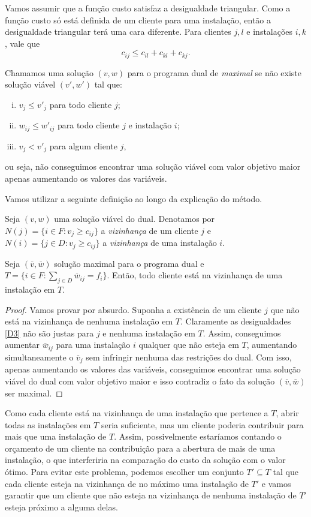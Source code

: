 Vamos assumir que a função custo satisfaz a desigualdade triangular. Como a função custo só está definida de um cliente para uma instalação, então a desigualdade triangular terá uma cara diferente. Para clientes $j,l$ e  instalações $i,k$, vale que
\[c_{ij} \leq c_{il} + c_{kl} + c_{kj}.\]

Chamamos uma solução $(v,w)$ para o programa dual de \emph{maximal} se não existe solução viável $(v',w')$ tal que:
\begin{enumerate}[(i)]
    \item $v_j \leq v'_j$ para todo cliente $j$;
    \item $w_{ij} \leq w'_{ij}$ para todo cliente $j$ e instalação $i$;
    \item $v_j < v'_j$ para algum cliente $j$,
\end{enumerate}
ou seja, não conseguimos encontrar uma solução viável com valor objetivo maior apenas aumentando os valores das variáveis.

Vamos utilizar a seguinte definição ao longo da explicação do método.
\begin{definition}
    Seja $(v,w)$ uma solução viável do dual. Denotamos por $N(j) = \{i \in F:v_j \geq c_{ij}\}$ a \emph{vizinhança} de um cliente $j$ e $N(i) = \{j \in D:v_j \geq c_{ij}\}$ a \emph{vizinhança} de uma instalação $i$.
\end{definition}

\begin{theorem}
    Seja $(\overline v, \overline w)$ solução maximal para o programa dual e $T = \{i \in F: \sum_{j \in D} \overline{w}_{ij} = f_i\}$. Então, todo cliente está na vizinhança de uma instalação em $T$.      
\end{theorem}
\begin{proof}
    Vamos provar por absurdo. Suponha a existência de um cliente $j$ que não está na vizinhança de nenhuma instalação em $T$. Claramente as desigualdades \eqref{D3} não são justas para $j$ e nenhuma instalação em $T$. Assim, conseguimos aumentar $\overline{w}_{ij}$ para uma instalação $i$ qualquer que não esteja em $T$, aumentando simultaneamente o $\overline{v}_j$ sem infringir nenhuma das restrições do dual. Com isso, apenas aumentando os valores das variáveis, conseguimos encontrar uma solução viável do dual com valor objetivo maior e isso contradiz o fato da solução $(\overline{v},\overline{w})$ ser maximal. 
\end{proof}

Como cada cliente está na vizinhança de uma instalação que pertence a $T$, abrir todas as instalações em $T$ seria suficiente, mas um cliente poderia contribuir para mais que uma instalação de $T$. Assim, possivelmente estaríamos contando o orçamento de um cliente na contribuição para a abertura de mais de uma instalação, o que interferiria na comparação do custo da solução com o valor ótimo.
Para evitar este problema, podemos escolher um conjunto $T' \subseteq T$ tal que cada cliente esteja na vizinhança de no máximo uma instalação de $T'$ e vamos garantir que um cliente que não esteja na vizinhança de nenhuma instalação de $T'$ esteja próximo a alguma delas.

